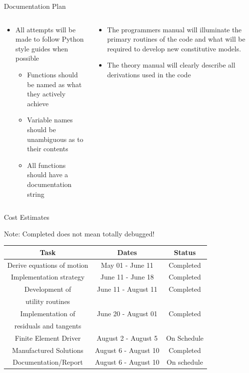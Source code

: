 \documentclass[11pt]{beamer}
\begin{document}
\begin{frame}{Documentation Plan}

\begin{columns}
\begin{column}{0.5\textwidth}
\begin{itemize}
\item{All attempts will be made to follow Python style guides when possible
\begin{itemize}
\item{Functions should be named as what they actively achieve}
\item{Variable names should be unambiguous as to their contents}
\item{All functions should have a documentation string}
\end{itemize}
}
\end{itemize}
\end{column}
\begin{column}{0.5\textwidth}
\begin{itemize}
\item{
The programmers manual will illuminate the primary routines of the code and what will be required to develop new constitutive models.
}
\item{The theory manual will clearly describe all derivations used in the code}
\end{itemize}
\end{column}
\end{columns}

\end{frame}

\begin{frame}{Cost Estimates}

Note: Completed does not mean totally debugged!

\begin{table}[htb!]
\centering
\begin{tabular}{|c|c|c|}
\hline
Task & Dates & Status\\
\hline
\hline
Derive equations of motion & May 01 - June 11 & \cellcolor{green!25}Completed\\
\hline
Implementation strategy & June 11 - June 18 & \cellcolor{green!25}Completed\\
\hline
Development of & June 11 - August 11 & \cellcolor{green!25} Completed \\
utility routines & & \cellcolor{green!25}\\
\hline
Implementation of &  June 20 - August 01 & \cellcolor{green!25} Completed\\
residuals and tangents & &\cellcolor{green!25}\\
\hline
Finite Element Driver & August 2 - August 5 & \cellcolor{yellow!25} On Schedule\\
\hline
Manufactured Solutions & August 6 - August 10 & \cellcolor{green!25} Completed\\
\hline
Documentation/Report & August 6 - August 10 & \cellcolor{yellow!25} On schedule\\
\hline
\end{tabular}
\label{table:development_status}
\end{table}

\end{frame}
\end{document}
